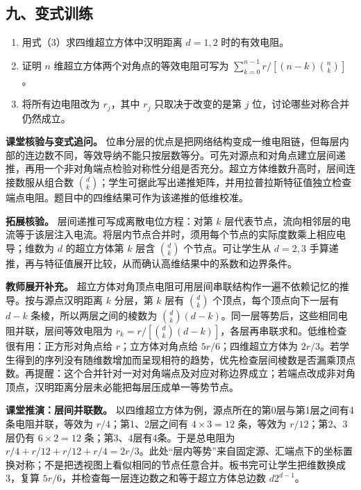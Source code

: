 \documentclass[12pt,a4paper,UTF8]{ctexart}
\newcommand{\tightlist}{\setlength{\itemsep}{0pt}\setlength{\parskip}{0pt}}
\begin{document}
\subsection{九、变式训练}\label{ux4e5dux53d8ux5f0fux8badux7ec3-3}

\begin{enumerate}
\def\labelenumi{\arabic{enumi}.}
\tightlist
\item
  用式（3）求四维超立方体中汉明距离 \(d=1,2\) 时的有效电阻。
\item
  证明 \(n\) 维超立方体两个对角点的等效电阻可写为
  \(\sum_{k=0}^{n-1}r/[(n-k)\binom nk]\)。
\item
  将所有边电阻改为 \(r_j\)，其中 \(r_j\) 只取决于改变的是第 \(j\)
  位，讨论哪些对称合并仍然成立。
\end{enumerate}

\textbf{课堂核验与变式追问。}
位串分层的优点是把网络结构变成一维电阻链，但每层内部的连边数不同，等效导纳不能只按层数等分。可先对源点和对角点建立层间递推，再用一个非对角端点检验对称性分组是否充分。超立方体维数升高时，层间连接数服从组合数
\(\binom{d}{k}\)；学生可据此写出递推矩阵，并用拉普拉斯特征值独立检查端点电阻。题目中的四维结果可作为该递推的低维校准。

\textbf{拓展核验。} 层间递推可写成离散电位方程：对第 \(k\)
层代表节点，流向相邻层的电流等于该层注入电流。将层内节点合并时，须用每个节点的实际度数乘上相应电导；维数为
\(d\) 的超立方体第 \(k\) 层含 \(\binom dk\) 个节点。可让学生从 \(d=2,3\)
手算递推，再与特征值展开比较，从而确认高维结果中的系数和边界条件。

\textbf{教师展开补充。}
超立方体对角顶点电阻可用层间串联结构作一遍不依赖记忆的推导。按与源点汉明距离
\(k\) 分层，第 \(k\) 层有 \(\binom dk\) 个顶点，每个顶点向下一层有
\(d-k\) 条棱，所以两层之间的棱数为
\(\binom dk(d-k)\)。同一层等势后，这些相同电阻并联，层间等效电阻为
\(r_k=r/[\binom dk(d-k)]\)，各层再串联求和。低维检查很有用：正方形对角点给
\(r\)；立方体对角点给 \(5r/6\)；四维超立方体为
\(2r/3\)。若学生得到的序列没有随维数增加而呈现相符的趋势，优先检查层间棱数是否漏乘顶点数。再提醒：这个合并针对一对对角端点及对应对称边界成立；若端点改成非对角顶点，汉明距离分层未必能把每层压成单一等势节点。

\textbf{课堂推演：层间并联数。}
以四维超立方体为例，源点所在的第0层与第1层之间有4条电阻并联，等效为
\(r/4\)；第1、2层之间有 \(4\times3=12\) 条，等效为
\(r/12\)；第2、3层仍有 \(6\times2=12\) 条；第3、4层有4条。于是总电阻为
\(r/4+r/12+r/12+r/4=2r/3\)。此处``层内等势''来自固定源、汇端点下的坐标置换对称；不是把透视图上看似相同的节点任意合并。板书完可让学生把维数换成3，复算
\(5r/6\)，并检查每一层连边数之和等于超立方体总边数 \(d2^{d-1}\)。
\end{document}
